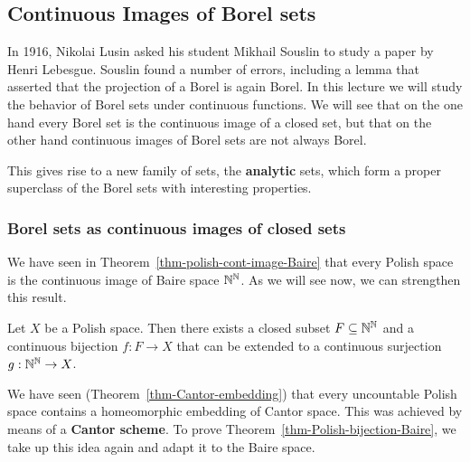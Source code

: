 \subsection{Continuous Images of Borel sets}

In 1916, Nikolai Lusin asked his student Mikhail Souslin to study a paper by Henri Lebesgue. Souslin found a number of errors, including a lemma that asserted that the projection of a Borel is again Borel. In this lecture we will study the behavior of Borel sets under continuous functions. We will see that on the one hand every Borel set is the continuous image of a closed set, but that on the other hand continuous images of Borel sets are not always Borel.

This gives rise to a new family of sets, the \textbf{analytic} sets, which form a proper superclass of the Borel sets with interesting properties.

\subsubsection{Borel sets as continuous images of closed sets}

We have seen in Theorem~\ref{thm-polish-cont-image-Baire} that every Polish space is the continuous image of Baire space $\mathbb{N}^{\mathbb{N}}$. As we will see now, we can strengthen this result.

\begin{theorem}\label{thm-polish-bijection-baire}Let $X$ be a Polish space. Then there exists a closed subset $F \subseteq \mathbb{N}^{\mathbb{N}}$ and a continuous bijection $f: F \to X$ that can be extended to a continuous surjection $g: \mathbb{N}^{\mathbb{N}} \to X$.

\end{theorem}We have seen (Theorem~\ref{thm-Cantor-embedding}) that every uncountable Polish space contains a homeomorphic embedding of Cantor space. This was achieved by means of a \textbf{Cantor scheme}. To prove Theorem~\ref{thm-Polish-bijection-Baire}, we take up this idea again and adapt it to the Baire space.


